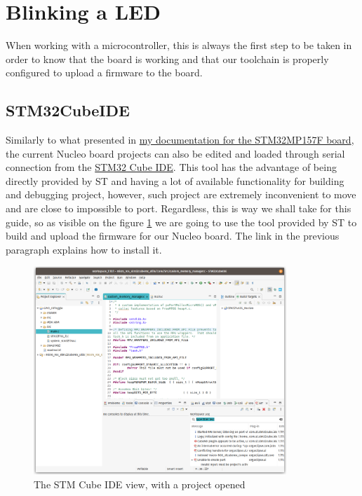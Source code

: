 \documentclass[10pt]{article}
\begin{document}
\section{Blinking a LED}
\label{sec:blinking-led}
When working with a microcontroller, this is always the first step to be taken
in order to know that the board is working and that our toolchain is properly
configured to upload a firmware to the board.

\subsection{STM32CubeIDE}
\label{sec:stm32cubeide}
Similarly to what presented in \href{https://gitlab.com/stm32mp157f-dk2/documentation}{my documentation for the STM32MP157F board}, the current Nucleo board projects can also be edited and loaded through serial connection from the \href{https://www.st.com/en/development-tools/stm32cubeide.html}{STM32 Cube IDE}. This tool has the advantage of being directly provided by ST and having a lot of available functionality for building and debugging project, however, such project are extremely inconvenient to move and are close to impossible to port. Regardless, this is way we shall take for this guide, so as visible on the figure \ref{fig:ide} we are going to use the tool provided by ST to build and upload the firmware for our Nucleo board. The link in the previous paragraph explains how to install it.

\begin{figure}[H]
  \centering
  \includegraphics[width=0.85\textwidth]{./img/ide.png}
  \caption{The STM Cube IDE view, with a project opened}
  \label{fig:ide}
\end{figure}
\end{document}

